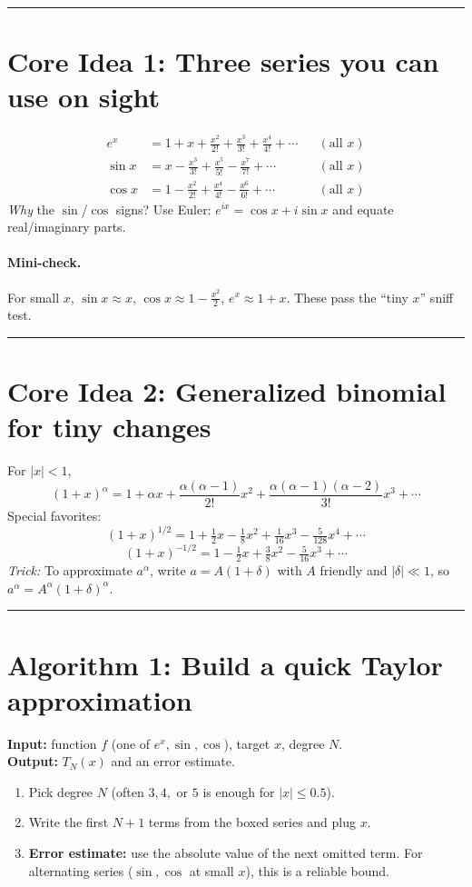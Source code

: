 \documentclass[11pt]{article}
\begin{document}
\bigskip\hrule\bigskip

\section*{Core Idea 1: Three series you can use on sight}
\[
\boxed{
\begin{aligned}
e^x&=1+x+\frac{x^2}{2!}+\frac{x^3}{3!}+\frac{x^4}{4!}+\cdots &&(\text{all }x)\\[4pt]
\sin x&=x-\frac{x^3}{3!}+\frac{x^5}{5!}-\frac{x^7}{7!}+\cdots &&(\text{all }x)\\[4pt]
\cos x&=1-\frac{x^2}{2!}+\frac{x^4}{4!}-\frac{x^6}{6!}+\cdots &&(\text{all }x)
\end{aligned}}
\]
\emph{Why} the \(\sin\)/\(\cos\) signs? Use Euler: \(e^{ix}=\cos x+i\sin x\) and equate real/imaginary parts.

\paragraph{Mini-check.} For small \(x\), \(\sin x\approx x\), \(\cos x\approx 1-\tfrac{x^2}{2}\), \(e^x\approx 1+x\). These pass the “tiny \(x\)” sniff test.

\bigskip\hrule\bigskip

\section*{Core Idea 2: Generalized binomial for tiny changes}
For \(|x|<1\),
\[
(1+x)^\alpha
=1+\alpha x+\frac{\alpha(\alpha-1)}{2!}x^2+\frac{\alpha(\alpha-1)(\alpha-2)}{3!}x^3+\cdots
\]
Special favorites:
\[
(1+x)^{1/2}=1+\tfrac12x-\tfrac18x^2+\tfrac1{16}x^3-\tfrac{5}{128}x^4+\cdots
\]
\[
(1+x)^{-1/2}=1-\tfrac12x+\tfrac{3}{8}x^2-\tfrac{5}{16}x^3+\cdots
\]
\emph{Trick:} To approximate \(a^\alpha\), write \(a=A(1+\delta)\) with \(A\) friendly and \(|\delta|\ll1\), so
\(a^\alpha=A^\alpha(1+\delta)^\alpha\).

\bigskip\hrule\bigskip

\section*{Algorithm 1: Build a quick Taylor approximation}
\textbf{Input:} function \(f\) (one of \(e^x,\sin,\cos\)), target \(x\), degree \(N\). \\
\textbf{Output:} \(T_N(x)\) and an error estimate.

\begin{enumerate}[label=\textbf{Step \arabic*.}]
  \item Pick degree \(N\) (often \(3,4,\) or \(5\) is enough for \(|x|\le 0.5\)).
  \item Write the first \(N\!+\!1\) terms from the boxed series and plug \(x\).
  \item \textbf{Error estimate:} use the absolute value of the next omitted term. For alternating series (\(\sin,\cos\) at small \(x\)), this is a reliable bound.
\end{enumerate}
\end{document}
